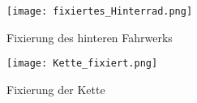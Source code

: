     \begin{figure}[H]
        \centering
        \texttt{[image: fixiertes\_Hinterrad.png]}
        \caption{Fixierung des hinteren Fahrwerks}
        \label{fig: Hinterrad_fixiert}
    \end{figure}

    \begin{figure}[H]
        \centering
        \texttt{[image: Kette\_fixiert.png]}
        \caption{Fixierung der Kette}
        \label{fig: Kette_fixiert}
    \end{figure}
